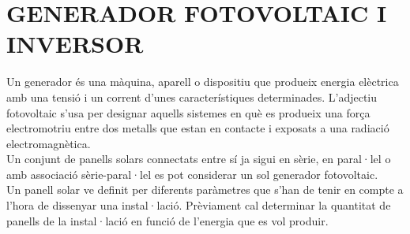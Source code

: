 \chapter{\uppercase{Generador fotovoltaic i inversor}}
Un generador és una màquina, aparell o dispositiu que produeix energia elèctrica amb una tensió i un corrent d'unes característiques determinades. L'adjectiu fotovoltaic s'usa per designar aquells sistemes en què es produeix una força electromotriu entre dos metalls que estan en contacte i exposats a una radiació electromagnètica.\\
\newline Un conjunt de panells solars connectats entre sí ja sigui en sèrie, en paral·lel o amb associació sèrie-paral·lel es pot considerar un sol generador fotovoltaic.\\
\newline Un panell solar ve definit per diferents paràmetres que s'han de tenir en compte a l'hora de dissenyar una instal·lació. Prèviament cal determinar la quantitat de panells de la instal·lació en funció de l'energia que es vol produir.

